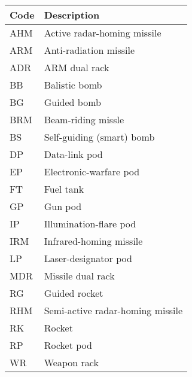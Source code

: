 \begin{onecolumntable}

\begin{tabular}{ll}
\toprule
Code&Description\\
\midrule
AHM&Active radar-homing missile\\
ARM&Anti-radiation missile\\
ADR&ARM dual rack\\
BB&Balistic bomb\\
BG&Guided bomb\\
BRM&Beam-riding missle\\
BS&Self-guiding (smart) bomb\\
DP&Data-link pod\\
EP&Electronic-warfare pod\\
FT&Fuel tank\\
GP&Gun pod\\
IP&Illumination-flare pod\\
IRM&Infrared-homing missile\\
LP&Laser-designator pod\\
MDR&Missile dual rack\\
RG&Guided rocket\\
RHM&Semi-active radar-homing missile\\
RK&Rocket\\
RP&Rocket pod\\
WR&Weapon rack\\
\bottomrule
\end{tabular}

\end{onecolumntable}
